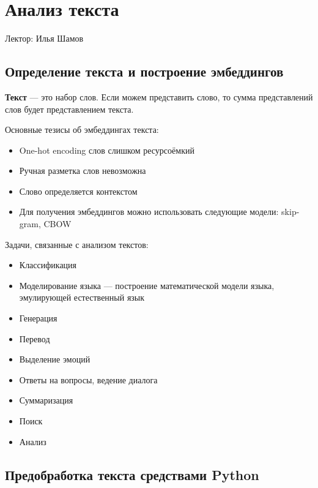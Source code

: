 \chapter{Анализ текста}

Лектор: Илья Шамов

\section{Определение текста и построение эмбеддингов}

\begin{definition}
    \textbf{Текст} --- это набор слов. Если можем представить слово, то сумма представлений слов будет представлением текста.
\end{definition}

Основные тезисы об эмбеддингах текста:
\begin{itemize}
    \item One-hot encoding слов слишком ресурсоёмкий
    \item Ручная разметка слов невозможна
    \item Слово определяется контекстом
    \item Для получения эмбеддингов можно использовать следующие модели: skip-gram, CBOW
\end{itemize}

Задачи, связанные с анализом текстов:
\begin{itemize}
    \item Классификация
    \item Моделирование языка --- построение математической модели языка, эмулирующей естественный язык
    \item Генерация
    \item Перевод
    \item Выделение эмоций
    \item Ответы на вопросы, ведение диалога
    \item Суммаризация
    \item Поиск
    \item Анализ
\end{itemize}

\section{Предобработка текста средствами Python}

